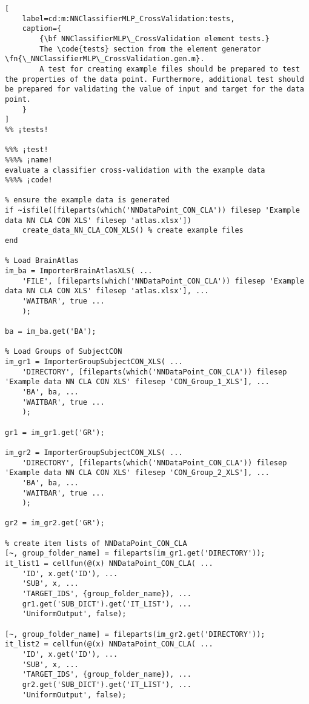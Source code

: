 \documentclass{tufte-handout}
\begin{document}
\clearpage

\begin{lstlisting}[
	label=cd:m:NNClassifierMLP_CrossValidation:tests,
	caption={
		{\bf NNClassifierMLP\_CrossValidation element tests.}
		The \code{tests} section from the element generator \fn{\_NNClassifierMLP\_CrossValidation.gen.m}.
		A test for creating example files should be prepared to test the properties of the data point. Furthermore, additional test should be prepared for validating the value of input and target for the data point.
	}
]			
%% ¡tests!

%%% ¡test!
%%%% ¡name!
evaluate a classifier cross-validation with the example data
%%%% ¡code!

% ensure the example data is generated
if ~isfile([fileparts(which('NNDataPoint_CON_CLA')) filesep 'Example data NN CLA CON XLS' filesep 'atlas.xlsx'])
    create_data_NN_CLA_CON_XLS() % create example files
end

% Load BrainAtlas
im_ba = ImporterBrainAtlasXLS( ...
    'FILE', [fileparts(which('NNDataPoint_CON_CLA')) filesep 'Example data NN CLA CON XLS' filesep 'atlas.xlsx'], ...
    'WAITBAR', true ...
    );

ba = im_ba.get('BA');

% Load Groups of SubjectCON
im_gr1 = ImporterGroupSubjectCON_XLS( ...
    'DIRECTORY', [fileparts(which('NNDataPoint_CON_CLA')) filesep 'Example data NN CLA CON XLS' filesep 'CON_Group_1_XLS'], ...
    'BA', ba, ...
    'WAITBAR', true ...
    );

gr1 = im_gr1.get('GR');

im_gr2 = ImporterGroupSubjectCON_XLS( ...
    'DIRECTORY', [fileparts(which('NNDataPoint_CON_CLA')) filesep 'Example data NN CLA CON XLS' filesep 'CON_Group_2_XLS'], ...
    'BA', ba, ...
    'WAITBAR', true ...
    );

gr2 = im_gr2.get('GR');

% create item lists of NNDataPoint_CON_CLA
[~, group_folder_name] = fileparts(im_gr1.get('DIRECTORY'));
it_list1 = cellfun(@(x) NNDataPoint_CON_CLA( ...
    'ID', x.get('ID'), ...
    'SUB', x, ...
    'TARGET_IDS', {group_folder_name}), ...
    gr1.get('SUB_DICT').get('IT_LIST'), ...
    'UniformOutput', false);

[~, group_folder_name] = fileparts(im_gr2.get('DIRECTORY'));
it_list2 = cellfun(@(x) NNDataPoint_CON_CLA( ...
    'ID', x.get('ID'), ...
    'SUB', x, ...
    'TARGET_IDS', {group_folder_name}), ...
    gr2.get('SUB_DICT').get('IT_LIST'), ...
    'UniformOutput', false);


\end{lstlisting}
\end{document}
